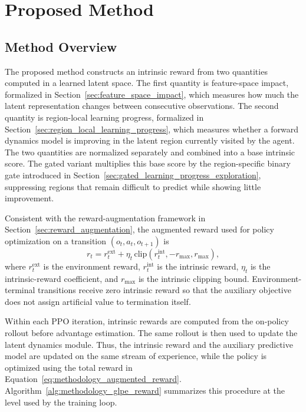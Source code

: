 \section{Proposed Method}
\label{sec:methodology_proposed_method}

\subsection{Method Overview}
\label{subsec:method_overview}

The proposed method constructs an intrinsic reward from two quantities computed in a learned latent space.
The first quantity is feature-space impact, formalized in Section~\ref{sec:feature_space_impact}, which measures how much the latent representation changes between consecutive observations.
The second quantity is region-local learning progress, formalized in Section~\ref{sec:region_local_learning_progress}, which measures whether a forward dynamics model is improving in the latent region currently visited by the agent.
The two quantities are normalized separately and combined into a base intrinsic score.
The gated variant multiplies this base score by the region-specific binary gate introduced in Section~\ref{sec:gated_learning_progress_exploration}, suppressing regions that remain difficult to predict while showing little improvement.

Consistent with the reward-augmentation framework in Section~\ref{sec:reward_augmentation}, the augmented reward used for policy optimization on a transition $(o_t,a_t,o_{t+1})$ is
\begin{equation}
    r_t
    = r_t^{\mathrm{ext}}
    + \eta_t\,\mathrm{clip}\!\left(r_t^{\mathrm{int}},-r_{\max},r_{\max}\right),
    \label{eq:methodology_augmented_reward}
\end{equation}
where $r_t^{\mathrm{ext}}$ is the environment reward, $r_t^{\mathrm{int}}$ is the intrinsic reward, $\eta_t$ is the intrinsic-reward coefficient, and $r_{\max}$ is the intrinsic clipping bound.
Environment-terminal transitions receive zero intrinsic reward so that the auxiliary objective does not assign artificial value to termination itself.

Within each PPO iteration, intrinsic rewards are computed from the on-policy rollout before advantage estimation.
The same rollout is then used to update the latent dynamics module.
Thus, the intrinsic reward and the auxiliary predictive model are updated on the same stream of experience, while the policy is optimized using the total reward in Equation~\ref{eq:methodology_augmented_reward}.
Algorithm~\ref{alg:methodology_glpe_reward} summarizes this procedure at the level used by the training loop.


